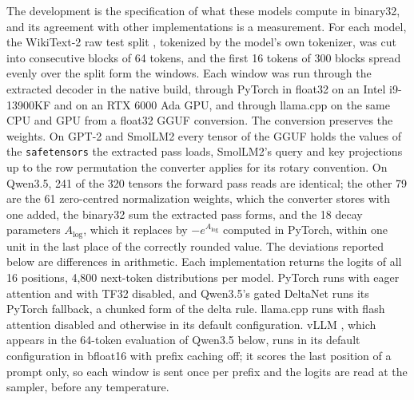 \documentclass[11pt]{article}
\theoremstyle{plain}
\theoremstyle{definition}
\newcommand{\code}[1]{\texttt{#1}}
\begin{document}
The development is the specification of what these models compute in binary32,
and its agreement with other implementations is a measurement. For each
model, the WikiText-2 raw test split \cite{wikitext}, tokenized by the
model's own tokenizer, was cut into consecutive blocks of 64 tokens, and the
first 16 tokens of 300 blocks spread evenly over the split form the windows.
Each window was run through the extracted decoder in the native build, through PyTorch in float32
on an Intel i9-13900KF and on an RTX 6000 Ada GPU, and through llama.cpp
\cite{llamacpp} on the same CPU and GPU from a float32 GGUF conversion. The
conversion preserves the weights. On GPT-2 and SmolLM2 every tensor of the GGUF
holds the values of the \code{safetensors} the extracted pass loads, SmolLM2's
query and key projections up to the row permutation the converter applies for
its rotary convention. On Qwen3.5, 241 of the 320 tensors the forward pass reads
are identical; the other 79 are the 61 zero-centred normalization weights,
which the converter stores with one added, the binary32 sum the extracted pass
forms, and the 18 decay parameters $A_{\log}$, which it replaces by
$-e^{A_{\log}}$ computed in PyTorch, within one unit in the last place of the
correctly rounded value. The deviations reported below are differences in
arithmetic.
Each implementation returns the logits of all 16 positions, 4{,}800 next-token
distributions per model. PyTorch runs with eager attention and with TF32
disabled, and Qwen3.5's gated DeltaNet runs its PyTorch fallback, a chunked form
of the delta rule. llama.cpp runs with flash attention disabled and otherwise
in its default configuration. vLLM \cite{vllm}, which appears in the 64-token
evaluation of Qwen3.5 below, runs in its default configuration in bfloat16
with prefix caching off; it scores the last position of a prompt only, so each window is
sent once per prefix and the logits are read at the sampler, before any
temperature.
\end{document}
